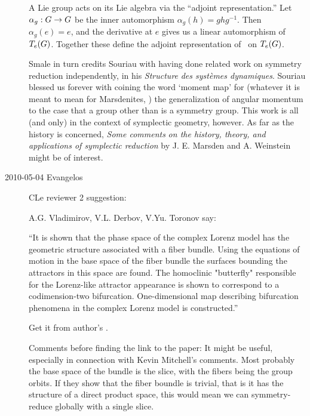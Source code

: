 \begin{description}
													\toCB
A Lie group acts on its Lie algebra via the ``adjoint representation.''
Let $\alpha_g : G \to G$ be the inner automorphism $\alpha_g(h)
= gh g^{-1}$. Then $\alpha_g(e) = e$, and the derivative at $e$ gives us
a linear automorphism of $T_e(G)$. Together these define the adjoint
representation of \Group\ on $T_e(G)$.


Smale in turn credits Souriau with having done related
work on symmetry reduction independently, in his
{\emph{Structure}} \emph{des syst\`emes dynamiques}. Souriau blessed us forever with
coining the word `moment map' for (whatever it is meant to mean for Marsdenites,
\ie)
the generalization of angular momentum to the case that a group other than
{} is a symmetry group.
This work is all (and only) in the
context of symplectic geometry, however. As far as the history is concerned,
{\emph{Some comments}} \emph{on the history, theory, and applications of
symplectic reduction} by J. E. Marsden and A. Weinstein
might be of interest.

\item[2010-05-04 Evangelos] CLe reviewer 2 suggestion:

A.G. Vladimirov, V.L. Derbov, V.Yu. Toronov
say:

``It is shown that the phase space of the complex Lorenz
model has the geometric structure associated with a fiber
bundle. Using the equations of motion in the base space of
the fiber bundle the surfaces bounding the attractors in this
space are found. The homoclinic "butterfly" responsible for
the Lorenz-like attractor appearance is shown to correspond
to a codimension-two bifurcation. One-dimensional map
describing bifurcation phenomena in the complex Lorenz model
is constructed.''

Get it from author's
.

Comments before finding the link to the paper: It might be
useful, especially in connection with Kevin Mitchell's
comments. Most probably the base space of the bundle is the
slice, with the fibers being the group orbits. If they show
that the fiber boundle is trivial, that is it has the
structure of a direct product space, this would mean
we can symmetry-reduce globally with a single slice.


\end{description}
